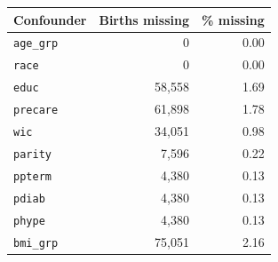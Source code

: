 {\small
\begin{tabular}{lrr}
\toprule
Confounder & Births missing & \% missing \\
\midrule
\texttt{age\_grp} & 0 & 0.00 \\
\texttt{race} & 0 & 0.00 \\
\texttt{educ} & 58,558 & 1.69 \\
\texttt{precare} & 61,898 & 1.78 \\
\texttt{wic} & 34,051 & 0.98 \\
\texttt{parity} & 7,596 & 0.22 \\
\texttt{ppterm} & 4,380 & 0.13 \\
\texttt{pdiab} & 4,380 & 0.13 \\
\texttt{phype} & 4,380 & 0.13 \\
\texttt{bmi\_grp} & 75,051 & 2.16 \\
\bottomrule
\end{tabular}
}
